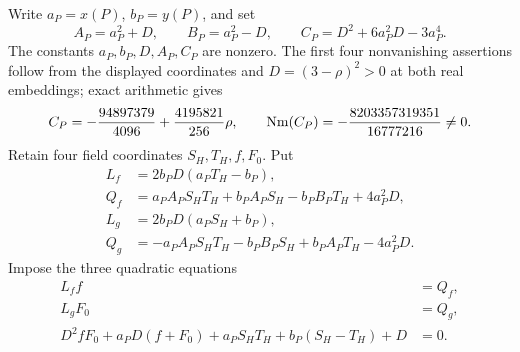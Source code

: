 \documentclass[11pt,a4paper]{article}
\begin{document}
Write $a_P=x(P)$, $b_P=y(P)$, and set
\[
 A_P=a_P^2+D,\qquad B_P=a_P^2-D,\qquad
 C_P=D^2+6a_P^2D-3a_P^4.
\]
The constants $a_P,b_P,D,A_P,C_P$ are nonzero. The first four
nonvanishing assertions follow from the displayed coordinates and
$D=(3-\rho)^2>0$ at both real embeddings; exact arithmetic gives
\[
 C_P=-\frac{94897379}{4096}+\frac{4195821}{256}\rho,
 \qquad \operatorname{Nm}(C_P)=-\frac{8203357319351}{16777216}\ne0.
\]
Retain four field coordinates $S_H,T_H,f,F_0$. Put
\begin{align*}
 L_f&=2b_PD(a_PT_H-b_P),\\
 Q_f&=a_PA_P S_H T_H+b_PA_P S_H-b_PB_PT_H+4a_P^2D,\\
 L_g&=2b_PD(a_P S_H+b_P),\\
 Q_g&=-a_PA_P S_H T_H-b_PB_P S_H+b_PA_PT_H-4a_P^2D.
\end{align*}
Impose the three quadratic equations
\begin{equation}\label{eq:Hchart}
 \begin{split}
 L_ff&=Q_f,\\
 L_gF_0&=Q_g,\\
 D^2fF_0+a_PD(f+F_0)+a_PS_HT_H+b_P(S_H-T_H)+D&=0.
 \end{split}
\end{equation}
\end{document}
